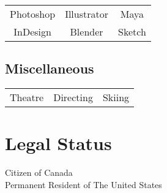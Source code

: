 \documentclass[letterpaper]{deedy-resume} %
\begin{document}
\begin{minipage}[t]{0.33\textwidth}
  \begin{tabular}{ c c c }
    Photoshop & Illustrator & Maya \\
    InDesign & Blender & Sketch
  \end{tabular}

  \vspace{4mm}

  \subsection{Miscellaneous}

  \begin{tabular}{ c c c }
    Theatre & Directing & Skiing
  \end{tabular}

  
  \sectionspace %



  \section{Legal Status} 

  Citizen of Canada \\
  Permanent Resident of The United States

  \sectionspace %


\end{minipage} %
\hfill
%
%
\end{document}
